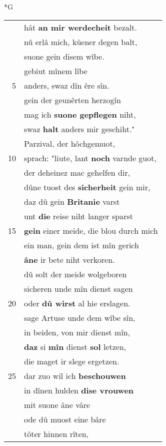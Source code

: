 \documentclass[8pt,a4paper,notitlepage]{article}
\begin{document}
\begin{table}[ht]
\begin{minipage}[t]{0.5\linewidth}
\small
\begin{center}*G
\end{center}
\begin{tabular}{rl}
 & hât \textbf{an mir werdecheit} bezalt.\\ 
 & nû erlâ mich, küener degen balt,\\ 
 & suone gein disem wîbe.\\ 
 & gebiut mînem lîbe\\ 
5 & anders, swaz dîn êre sîn.\\ 
 & gein der geunêrten herzogîn\\ 
 & mag ich \textbf{suone gepflegen} niht,\\ 
 & swaz \textbf{halt} anders mir geschiht."\\ 
 & Parzival, der hôchgemuot,\\ 
10 & sprach: "liute, lant \textbf{noch} varnde guot,\\ 
 & der deheinez mac gehelfen dir,\\ 
 & dûne tuost des \textbf{sicherheit} gein mir,\\ 
 & daz dû gein \textbf{Britanie} varst\\ 
 & unt \textbf{die} reise niht langer sparst\\ 
15 & \textbf{gein} einer meide, die blou durch mich\\ 
 & ein man, gein dem ist mîn gerich\\ 
 & \textbf{âne} ir bete niht verkoren.\\ 
 & dû solt der meide wolgeboren\\ 
 & sicheren unde mîn dienst sagen\\ 
20 & oder \textbf{dû wirst} al hie erslagen.\\ 
 & sage Artuse unde dem wîbe sîn,\\ 
 & in beiden, von mir dienst mîn,\\ 
 & \textbf{daz} si \textbf{mîn} dienst \textbf{sol} letzen,\\ 
 & die maget ir slege ergetzen.\\ 
25 & dar zuo wil ich \textbf{beschouwen}\\ 
 & in dînen hulden \textbf{dise vrouwen}\\ 
 & mit suone âne vâre\\ 
 & ode dû muost eine bâre\\ 
 & tôter hinnen rîten,\\ 

\end{tabular}
\end{minipage}
\end{table}
\end{document}
